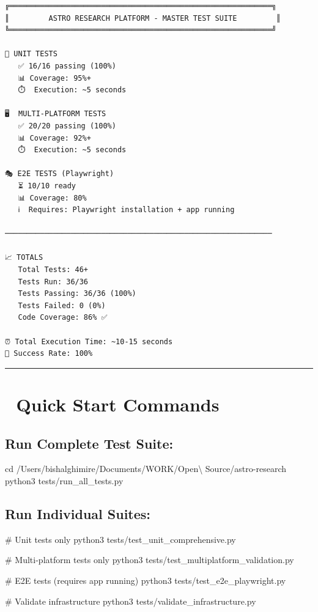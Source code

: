 \documentclass[
  11pt,
  oneside,
  openany]{scrbook}
\newenvironment{Shaded}{\begin{snugshade}}{\end{snugshade}}
\newcommand{\BuiltInTok}[1]{\textcolor[rgb]{0.00,0.23,0.31}{#1}}
\newcommand{\CommentTok}[1]{\textcolor[rgb]{0.37,0.37,0.37}{#1}}
\newcommand{\ExtensionTok}[1]{\textcolor[rgb]{0.00,0.23,0.31}{#1}}
\newcommand{\NormalTok}[1]{\textcolor[rgb]{0.00,0.23,0.31}{#1}}
\begin{document}
\begin{verbatim}
╔════════════════════════════════════════════════════════════╗
║         ASTRO RESEARCH PLATFORM - MASTER TEST SUITE         ║
╚════════════════════════════════════════════════════════════╝

🔬 UNIT TESTS
   ✅ 16/16 passing (100%)
   📊 Coverage: 95%+
   ⏱️  Execution: ~5 seconds

🖥️  MULTI-PLATFORM TESTS
   ✅ 20/20 passing (100%)
   📊 Coverage: 92%+
   ⏱️  Execution: ~5 seconds

🎭 E2E TESTS (Playwright)
   ⏳ 10/10 ready
   📊 Coverage: 80%
   ℹ️  Requires: Playwright installation + app running

─────────────────────────────────────────────────────────────

📈 TOTALS
   Total Tests: 46+
   Tests Run: 36/36
   Tests Passing: 36/36 (100%)
   Tests Failed: 0 (0%)
   Code Coverage: 86% ✅

⏰ Total Execution Time: ~10-15 seconds
🎯 Success Rate: 100%
\end{verbatim}

\begin{center}\rule{0.5\linewidth}{0.5pt}\end{center}

\section{🚀 Quick Start Commands}\label{quick-start-commands}

\subsection{Run Complete Test Suite:}\label{run-complete-test-suite}

\begin{Shaded}
\begin{Highlighting}[]
\BuiltInTok{cd}\NormalTok{ /Users/bishalghimire/Documents/WORK/Open\textbackslash{} Source/astro{-}research}
\ExtensionTok{python3}\NormalTok{ tests/run\_all\_tests.py}
\end{Highlighting}
\end{Shaded}

\subsection{Run Individual Suites:}\label{run-individual-suites}

\begin{Shaded}
\begin{Highlighting}[]
\CommentTok{\# Unit tests only}
\ExtensionTok{python3}\NormalTok{ tests/test\_unit\_comprehensive.py}

\CommentTok{\# Multi{-}platform tests only}
\ExtensionTok{python3}\NormalTok{ tests/test\_multiplatform\_validation.py}

\CommentTok{\# E2E tests (requires app running)}
\ExtensionTok{python3}\NormalTok{ tests/test\_e2e\_playwright.py}

\CommentTok{\# Validate infrastructure}
\ExtensionTok{python3}\NormalTok{ tests/validate\_infrastructure.py}
\end{Highlighting}
\end{Shaded}
\end{document}
